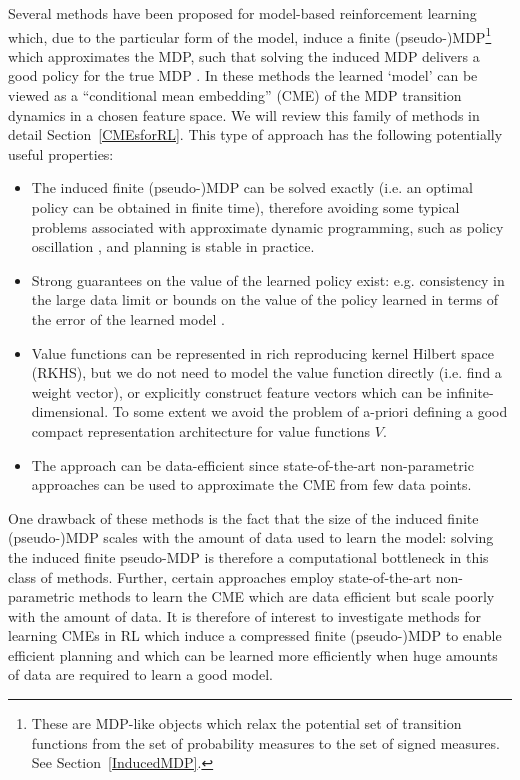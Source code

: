 \documentclass[letterpaper]{article}
\newcommand{\CsabaFLAM}{DBLP:conf/adprl/YaoSPZ14}
\newcommand{\GrunewalderEmbeddingsRL}{GrunewalderEmbeddingsMDP}
\newcommand{\BertsekasApproximate}{BertsekasApproximate}
\newcommand{\OrmoneitKBRL}{DBLP:journals/ml/OrmoneitS02}
\begin{document}
Several methods have been proposed for model-based reinforcement learning which, due to the particular form of the model, induce a finite (pseudo-)MDP\footnote{These are MDP-like objects which relax the potential set of transition functions from the set of probability measures to the set of signed measures. See Section~\ref{InducedMDP}.} which approximates the MDP, such that solving the induced MDP delivers a good policy for the true MDP \citep{\OrmoneitKBRL,\GrunewalderEmbeddingsRL,\CsabaFLAM}. In these methods the learned `model' can be viewed as a ``conditional mean embedding'' (CME) of the MDP transition dynamics in a chosen feature space. We will review this family of methods in detail Section~\ref{CMEsforRL}. This type of approach has the following potentially useful properties:
\begin{itemize}
\item The induced finite (pseudo-)MDP can be solved exactly (i.e. an optimal policy can be obtained in finite time), therefore avoiding some typical problems associated with approximate dynamic programming, such as policy oscillation \cite[e.g.][]{\BertsekasApproximate}, and planning is stable in practice.
\item Strong guarantees on the value of the learned policy exist: e.g. consistency in the large data limit \citep{\OrmoneitKBRL} or bounds on the value of the policy learned in terms of the error of the learned model \citep{\GrunewalderEmbeddingsRL,\CsabaFLAM}.
\item Value functions can be represented in rich reproducing kernel Hilbert space (RKHS), but we do not need to model the value function directly (i.e. find a weight vector), or explicitly construct feature vectors which can be infinite-dimensional. To some extent we avoid the problem of a-priori defining a good compact representation architecture for value functions $V$.
\item The approach can be data-efficient since state-of-the-art non-parametric approaches can be used to approximate the CME from few data points.
\end{itemize}

One drawback of these methods is the fact that the size of the induced finite (pseudo-)MDP scales with the amount of data used to learn the model: solving the induced finite pseudo-MDP is therefore a computational bottleneck in this class of methods. Further, certain approaches \citep[notably][]{\GrunewalderEmbeddingsRL} employ state-of-the-art non-parametric methods to learn the CME which are data efficient but scale poorly with the amount of data. It is therefore of interest to investigate methods for learning CMEs in RL which induce a compressed finite (pseudo-)MDP to enable efficient planning and which can be learned more efficiently when huge amounts of data are required to learn a good model.
\end{document}
